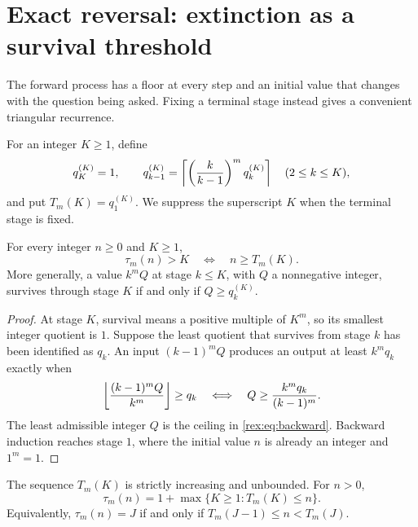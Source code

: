 \section{Exact reversal: extinction as a survival threshold}\label{rex:sec:duality}

The forward process has a floor at every step and an initial value that
changes with the question being asked. Fixing a terminal stage instead
gives a convenient triangular recurrence.

\begin{definition}\label{rex:def:backward}
For an integer $K\geq1$, define
\begin{equation}\label{rex:eq:backward}
 q_K^{(K)}=1,\qquad
 q_{k-1}^{(K)}=\left\lceil \left(\frac{k}{k-1}\right)^m q_k^{(K)}\right\rceil
 \quad(2\leq k\leq K),
\end{equation}
and put $T_m(K)=q_1^{(K)}$. We suppress the superscript $K$ when the
terminal stage is fixed.
\end{definition}

\begin{lemma}\label{rex:lem:duality}
For every integer $n\geq0$ and $K\geq1$,
\begin{equation}\label{rex:eq:duality}
 \tau_m(n)>K\quad\Longleftrightarrow\quad n\geq T_m(K).
\end{equation}
More generally, a value $k^m Q$ at stage $k\leq K$, with $Q$ a
nonnegative integer, survives through stage $K$ if and only if
$Q\geq q_k^{(K)}$.
\end{lemma}

\begin{proof}
At stage $K$, survival means a positive multiple of $K^m$, so its smallest
integer quotient is $1$. Suppose the least quotient that survives from
stage $k$ has been identified as $q_k$. An input $(k-1)^m Q$ produces an
output at least $k^m q_k$ exactly when
\[
 \left\lfloor \frac{(k-1)^m Q}{k^m}\right\rfloor\geq q_k
 \quad\Longleftrightarrow\quad
 Q\geq\frac{k^m q_k}{(k-1)^m}.
\]
The least admissible integer $Q$ is the ceiling in
\cref{rex:eq:backward}. Backward induction reaches stage $1$, where the
initial value $n$ is already an integer and $1^m=1$.
\end{proof}

\begin{corollary}\label{rex:cor:inverse}
The sequence $T_m(K)$ is strictly increasing and unbounded. For $n>0$,
\begin{equation}\label{rex:eq:exact-inverse}
 \tau_m(n)=1+\max\{K\geq1:T_m(K)\leq n\}.
\end{equation}
Equivalently, $\tau_m(n)=J$ if and only if
$T_m(J-1)\leq n<T_m(J)$.
\end{corollary}


